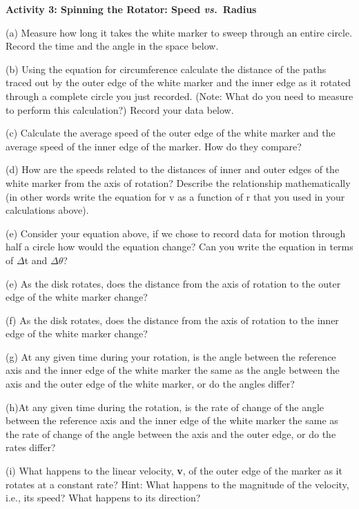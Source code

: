 \textbf{Activity 3: Spinning the Rotator: Speed \textit{vs.}~Radius} 

(a) Measure how long it takes the white marker to sweep through an entire circle.
Record the time and the angle in the space below.
\answerspace{10mm}

(b) Using the equation for circumference calculate the distance of the paths traced out by the outer edge of the white marker and the inner edge as it rotated through a complete circle you just recorded.
(Note: What do you need to measure to perform this calculation?) Record your
data below.
\answerspace{20mm}

(c) Calculate the average speed of the outer edge of the white marker and the
average speed of the inner edge of the marker. How do they compare?
\answerspace{20mm}

(d) How are the speeds related to the distances of inner and
outer edges of the white marker from the axis of rotation? Describe the
relationship mathematically (in other words write the equation for v as a function of r that you used in your calculations above).
\answerspace{18mm}

\pagebreak[2]

(e) Consider your equation above, if we chose to record data for motion through half a circle how would the equation change?  Can you write the equation in terms of  \( \Delta  \)t and \( \Delta  \)\( \theta \)?  
\answerspace{10mm}

(e) As the disk rotates, does the distance from the axis of rotation to the outer edge of the white marker change?
\answerspace{10mm}

(f) As the disk rotates, does the distance from the axis of rotation to the inner edge of the white marker change?
\vspace{10mm}

(g) At any given time during your rotation, is the angle between the reference
axis and the inner edge of the white marker the same as the angle between the
axis and the outer edge of the white marker, or do the angles differ?
\vspace{10mm}

(h)At any given time during the rotation, is the rate of change of the angle
between the reference axis and the inner edge of the white marker the same as
the rate of change of the angle between the axis and the outer edge, or do the
rates differ?
\vspace{10mm}

(i) What happens to the linear velocity, \textbf{v}, of the outer edge of the
marker as it rotates at a constant rate? Hint: What happens to the magnitude
of the velocity, i.e., its speed? What happens to its direction?
\vspace{20mm}

